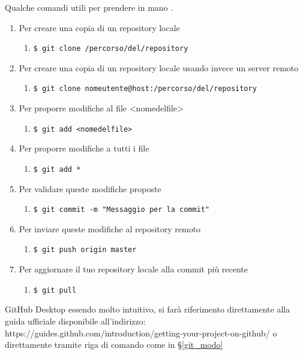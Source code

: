 \documentclass[a4paper,11pt]{article}
\begin{document}
		 \label{git_modo} 
		Qualche comandi utili per prendere in mano .
		\begin{enumerate}			
			\item Per creare una copia di un repository locale
			\begin{enumerate} \item[] \texttt{\$ git clone /percorso/del/repository}\end{enumerate}
			\item Per creare una copia di un repository locale usando invece un server remoto 
			\begin{enumerate} \item[] \texttt{\$ git clone nomeutente@host:/percorso/del/repository} \end{enumerate}
			\item Per proporre modifiche al file <nomedelfile>		
			\begin{enumerate} \item[] \texttt{\$ git add <nomedelfile> } \end{enumerate}
			\item Per proporre modifiche a tutti i file
			\begin{enumerate} \item[] \texttt{\$ git add * }\end{enumerate}
			\item Per validare queste modifiche proposte 
			\begin{enumerate} \item[] \texttt{\$ git commit -m "Messaggio per la commit"}  \end{enumerate}
			\item Per inviare queste modifiche al repository remoto
			\begin{enumerate} \item[] \texttt{\$ git push origin master }\end{enumerate}
			\item Per aggiornare il tuo repository locale alla commit più recente	
			\begin{enumerate} \item[] \texttt{\$ git pull } \end{enumerate}
		\end{enumerate}
			GitHub Desktop essendo molto intuitivo, si farà riferimento direttamente alla guida ufficiale disponibile all'indirizzo: https://guides.github.com/introduction/getting-your-project-on-github/  o direttamente tramite riga di comando come in §\ref{git_modo} 
\end{document}

